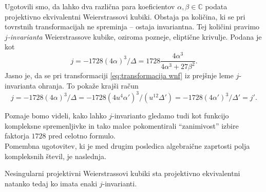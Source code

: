 \documentclass[mat1]{fmfdelo}
\numberwithin{equation}{section}
\newcommand{\C}{\mathbb C}
\theoremstyle{definition}
\begin{document}
Ugotovili smo, da lahko dva različna para koeficientov $\alpha, \beta \in \C$ podata projektivno ekvivalentni Weierstrassovi kubiki. Obstaja pa količina, ki se pri tovrstnih transformacijah ne spreminja -- ostaja invariantna. Tej količini pravimo \emph{$j$-invarianta} Weierstrassove kubike, oziroma pozneje, eliptične krivulje. Podana je kot 
\[
    j = -1728(4\alpha)^3/\Delta = 1728\frac{4\alpha^3}{4\alpha^3 + 27\beta^2}.  
\] 
Jasno je, da se pri transformaciji \eqref{eq:transformacija wnf} iz prejšnje leme $j$-invarianta ohranja. To pokaže krajši račun
\[
    j = -1728(4\alpha)^3/\Delta = -1728(4u^4\alpha')^3/(u^{12}\Delta') = -1728(4\alpha')^3/\Delta' = j'.
\]

Poznaje bomo videli, kako lahko $j$-invarianto gledamo tudi kot funkcijo kompleksne spremenljivke in tako malce pokomentirali ``zanimivost'' izbire faktorja $1728$ pred celotno formulo.
\\

Pomembna ugotovitev, ki je med drugim posledica algebraične zaprtosti polja kompleksnih števil, je naslednja. 

\begin{trditev}
    Nesingularni projektivni Weierstrassovi kubiki sta projektivno ekvivalentni natanko tedaj ko imata enaki $j$-invarianti.
\end{trditev}
\end{document}
